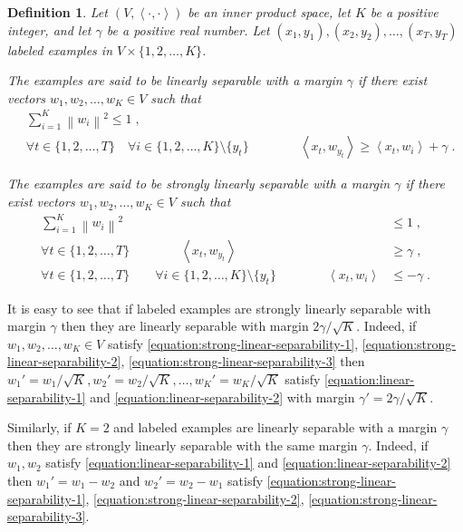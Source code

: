 \documentclass[12pt]{article}
\newtheorem{definition}{Definition}
\newcommand{\ip}[2]{\left\langle #1, #2 \right\rangle} %
\newcommand{\norm}[1]{\left\| #1 \right\|}  %
\begin{document}
\begin{definition}
Let $(V,\ip{\cdot}{\cdot})$ be an inner product space, let $K$ be a positive
integer, and let $\gamma$ be a positive real number. Let $(x_1, y_1), (x_2,
y_2), \dots, (x_T, y_T)$ labeled examples in $V \times \{1,2,\dots,K\}$.

The examples are said to be \emph{linearly separable with a
margin $\gamma$} if there exist vectors $w_1, w_2, \dots, w_K \in V$ such
that
\begin{align}
\label{equation:linear-separability-1}
& \sum_{i=1}^K \norm{w_i}^2 \le 1 \; , \\
\label{equation:linear-separability-2}
& \forall t \in \{1,2,\dots,T\} \quad \forall i \in \{1,2,\dots, K\} \setminus \{y_t\} \qquad \qquad \ip{x_t}{w_{y_t}} \ge \ip{x_t}{w_i} + \gamma \; .
\end{align}

The examples are said to be \emph{strongly linearly separable with a
margin $\gamma$} if there exist vectors $w_1, w_2, \dots, w_K \in V$ such
that
\begin{align}
\label{equation:strong-linear-separability-1}
\sum_{i=1}^K \norm{w_i}^2 & \le 1 \; , \\
\label{equation:strong-linear-separability-2}
\forall t \in \{1,2,\dots,T\} \qquad \qquad \ip{x_t}{w_{y_t}} &\ge \gamma \; , \\
\label{equation:strong-linear-separability-3}
\forall t \in \{1,2,\dots,T\} \qquad \forall i \in \{1,2,\dots, K\} \setminus \{y_t\} \qquad \qquad \ip{x_t}{w_i} & \le - \gamma \; .
\end{align}
\end{definition}

It is easy to see that if labeled examples are strongly linearly
separable with margin $\gamma$ then they are linearly separable with margin
$2\gamma/\sqrt{K}$. Indeed, if $w_1, w_2, \dots, w_K \in V$
satisfy \eqref{equation:strong-linear-separability-1},
\eqref{equation:strong-linear-separability-2},
\eqref{equation:strong-linear-separability-3} then $w_1' = w_1/\sqrt{K}, w_2' =
w_2/\sqrt{K}, \dots, w_K' = w_K/\sqrt{K}$ satisfy
\eqref{equation:linear-separability-1} and
\eqref{equation:linear-separability-2} with margin $\gamma' = 2\gamma/\sqrt{K}$.

Similarly, if $K=2$ and labeled examples are linearly separable with a margin
$\gamma$ then they are strongly linearly separable with the same margin
$\gamma$. Indeed, if $w_1, w_2$ satisfy \eqref{equation:linear-separability-1}
and \eqref{equation:linear-separability-2} then $w_1' = w_1 - w_2$ and $w_2' =
w_2 - w_1$ satisfy \eqref{equation:strong-linear-separability-1},
\eqref{equation:strong-linear-separability-2},
\eqref{equation:strong-linear-separability-3}.
\end{document}
